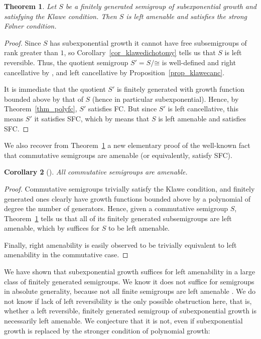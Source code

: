 \documentclass[11pt,a4paper,reqno]{amsart}
\newtheorem{theorem}{Theorem}[section]
\newtheorem{corollary}[theorem]{Corollary}
\begin{document}
\begin{theorem}\label{thm_polyklawe}
Let $S$ be a finitely generated semigroup of subexponential growth and
satisfying the Klawe condition. Then $S$ is left amenable and satisfies
the strong F\o lner condition.
\end{theorem}
\begin{proof}
Since $S$ has subexponential growth it cannot have free subsemigroups of
rank greater than $1$, so Corollary~\ref{cor_klawedichotomy} tells us
that $S$ is left reversible. Thus, the quotient semigroup $S' = S / \mathord{\cong}$
is well-defined and right cancellative by \cite[Proposition~1.24]{Paterson88},
and left cancellative by Proposition~\ref{prop_klawecanc}.

It is immediate that the quotient $S'$ is finitely generated with growth
function bounded above by that of $S$ (hence in particular subexponential).
Hence, by Theorem~\ref{thm_polyfc}, $S'$
satisfies FC. But since $S'$ is left cancellative,
this means $S'$ it satisfies SFC, which by \cite[Theorems 1 and 5]{Argabright67}
means that $S$ is left amenable and satisfies SFC.
\end{proof}

We also recover from Theorem~\ref{thm_polyklawe} a new elementary proof of the
well-known fact that commutative semigroups are amenable (or equivalently,
satisfy SFC).

\begin{corollary}[{\cite[Theorem~4]{Argabright67}}]
All commutative semigroups are amenable.
\end{corollary}
\begin{proof}
Commutative semigroups trivially satisfy the
Klawe condition, and finitely generated ones clearly have
growth functions bounded above by a polynomial of degree the 
number of generators. Hence, given a commutative semigroup $S$, Theorem~\ref{thm_polyklawe}
tells us that all of its finitely generated subsemigroups are
left amenable, which by \cite[Problem 0.30]{Paterson88} suffices for
$S$ to be left amenable.

Finally, right amenability is easily observed to be trivially equivalent
to left amenability in the commutative case.
\end{proof}

We have shown that subexponential growth suffices for left amenability
in a large class of finitely generated semigroups. We know it does not
suffice for semigroups in absolute generality, because not all finite
semigroups are left amenable \cite[Corollary 1.19]{Paterson88}. We do not know if lack of
left reversibility is the only possible obstruction here, that is, whether
a left reversible, finitely generated semigroup of subexponential growth
is necessarily left amenable.  We conjecture that it is not, even if
subexponential growth is replaced by the stronger condition of polynomial
growth:
\end{document}
